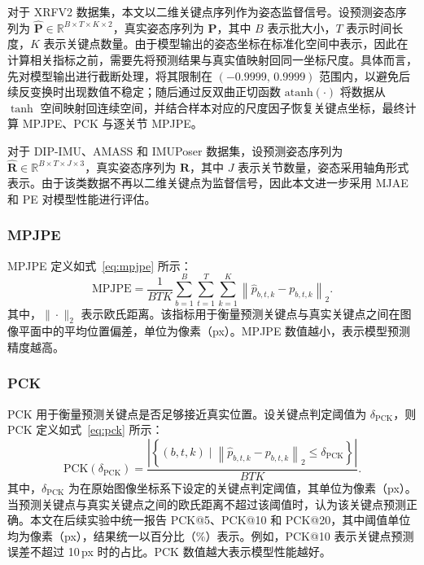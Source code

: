 对于 XRFV2 数据集，本文以二维关键点序列作为姿态监督信号。设预测姿态序列为 $\hat{\mathbf{P}} \in \mathbb{R}^{B \times T \times K \times 2}$，真实姿态序列为 $\mathbf{P}$，其中 $B$ 表示批大小，$T$ 表示时间长度，$K$ 表示关键点数量。由于模型输出的姿态坐标在标准化空间中表示，因此在计算相关指标之前，需要先将预测结果与真实值映射回同一坐标尺度。具体而言，先对模型输出进行截断处理，将其限制在 $(-0.9999,\,0.9999)$ 范围内，以避免后续反变换时出现数值不稳定；随后通过反双曲正切函数 $\mathrm{atanh}(\cdot)$ 将数据从 $\tanh$ 空间映射回连续空间，并结合样本对应的尺度因子恢复关键点坐标，最终计算 MPJPE、PCK 与逐关节 MPJPE。

对于 DIP-IMU、AMASS 和 IMUPoser 数据集，设预测姿态序列为 $\hat{\mathbf{R}} \in \mathbb{R}^{B \times T \times J \times 3}$，真实姿态序列为 $\mathbf{R}$，其中 $J$ 表示关节数量，姿态采用轴角形式表示。由于该类数据不再以二维关键点为监督信号，因此本文进一步采用 MJAE 和 PE 对模型性能进行评估。

\subsubsection{MPJPE}{}

MPJPE 定义如式~\eqref{eq:mpjpe} 所示：
\begin{equation}
\text{MPJPE} =
\frac{1}{B T K}
\sum_{b=1}^{B}
\sum_{t=1}^{T}
\sum_{k=1}^{K}
\left\|
\hat{p}_{b,t,k} - p_{b,t,k}
\right\|_2.
\label{eq:mpjpe}
\end{equation}
其中，$\|\cdot\|_2$ 表示欧氏距离。该指标用于衡量预测关键点与真实关键点之间在图像平面中的平均位置偏差，单位为像素（px）。MPJPE 数值越小，表示模型预测精度越高。

\subsubsection{PCK}{}

PCK 用于衡量预测关键点是否足够接近真实位置。设关键点判定阈值为 $\delta_{\mathrm{PCK}}$，则 PCK 定义如式~\eqref{eq:pck} 所示：
\begin{equation}
\text{PCK}(\delta_{\mathrm{PCK}})=
\frac{
\left|\left\{(b,t,k)\mid \left\|\hat{p}_{b,t,k}-p_{b,t,k}\right\|_2 \leq \delta_{\mathrm{PCK}} \right\}\right|
}{BTK}.
\label{eq:pck}
\end{equation}
其中，$\delta_{\mathrm{PCK}}$ 为在原始图像坐标系下设定的关键点判定阈值，其单位为像素（px）。当预测关键点与真实关键点之间的欧氏距离不超过该阈值时，认为该关键点预测正确。本文在后续实验中统一报告 PCK@5、PCK@10 和 PCK@20，其中阈值单位均为像素（px），结果统一以百分比（\%）表示。例如，PCK@10 表示关键点预测误差不超过 10\,px 时的占比。PCK 数值越大表示模型性能越好。

